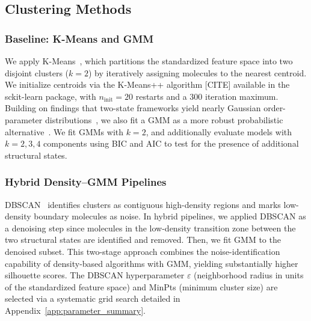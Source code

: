 \documentclass[aps, amsmath,amssymb, reprint, twocolumn, superscriptaddress]{revtex4-1}
\begin{document}
\subsection{Clustering Methods}
\label{sec:clustering_algorithm}

\subsubsection{Baseline: K-Means and GMM}
We apply K-Means~\cite{ikotun_k-means_2023}, which partitions the standardized feature space into two disjoint clusters ($k=2$) by iteratively assigning molecules to the nearest  centroid. We initialize centroids via the K-Means++ algorithm [CITE] available in the sckit-learn package\cite{scikit-learn}, with $n_{\text{init}} = 20$ restarts and a 300 iteration maximum. Building on findings that two-state frameworks yield nearly Gaussian  order-parameter distributions~\cite{shi_direct_2020}, we also fit a GMM as a more robust  probabilistic alternative~\cite{deprez-2024}. We fit GMMs with $k=2$, and additionally evaluate  models with $k=2,3,4$ components using BIC and AIC to test for the presence of additional  structural states.

\subsubsection{Hybrid Density--GMM Pipelines}
DBSCAN~\cite{ester_density-based_1996} identifies clusters as contiguous high-density regions and marks low-density boundary molecules as noise. In hybrid pipelines, we applied DBSCAN as a denoising step since molecules in the low-density transition zone between the two structural states are identified and removed. Then,  we fit GMM to the denoised subset. This two-stage approach combines the noise-identification capability of density-based algorithms with GMM, yielding substantially higher silhouette scores. The DBSCAN hyperparameter $\varepsilon$ (neighborhood radius in units of the standardized feature space) and MinPts (minimum cluster size) are selected via a systematic grid search detailed in Appendix~\ref{app:parameter_summary}.
\end{document}
